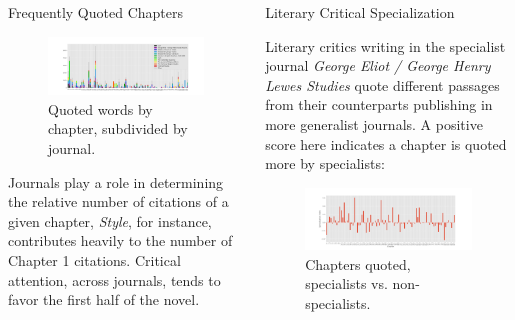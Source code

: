 \documentclass[final]{beamer}
\newlength{\onecolwid}
\newlength{\twocolwid}
\begin{document}
\begin{frame}[t]
\begin{columns}[t]
\begin{column}{\twocolwid}
\begin{columns}[t,totalwidth=\twocolwid]
\begin{column}{\onecolwid}
\begin{block}{Frequently Quoted Chapters}

\begin{figure}
\includegraphics[width=0.9\linewidth]{synchronic-journals.png}
\caption{Quoted words by chapter, subdivided by journal.}
\end{figure}

Journals play a role in determining the relative number of citations of a given chapter, \emph{Style}, for instance, contributes heavily to the number of Chapter 1 citations.  Critical attention, across journals, tends to favor the first half of the novel.

\end{block}


\end{column} %

\begin{column}{\onecolwid}\vspace{-.6in} %


\begin{block}{Literary Critical Specialization}

Literary critics writing in the specialist journal \emph{George Eliot / George Henry Lewes Studies} quote different passages from their counterparts publishing in more generalist journals. A positive score here indicates a chapter is quoted more by specialists:  

\begin{figure}
\includegraphics[width=0.9\linewidth]{specialization.png}
\caption{Chapters quoted, specialists vs. non-specialists.}
\end{figure}



\end{block}
\end{column}
\end{columns}
\end{column}
\end{columns}
\end{frame}
\end{document}
